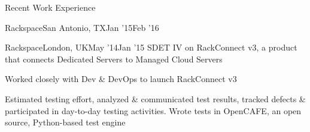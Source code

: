 \documentclass{resume} %
\begin{document}
\begin{rSection}{Recent Work Experience}
\begin{rSubsection}{Rackspace}{San Antonio, TX}{Jan '15}{Feb '16}
\end{rSubsection}


\begin{rSubsection}{Rackspace}{London, UK}{May '14}{Jan '15}
{SDET IV on RackConnect v3, a product that connects Dedicated Servers to Managed Cloud Servers}

\item Worked closely with Dev \& DevOps to launch RackConnect v3
\item Estimated testing effort, analyzed \& communicated test results, tracked defects \& participated in day-to-day testing activities. Wrote tests in OpenCAFE, an open source, Python-based test engine
\end{rSubsection}
\end{rSection}

\end{document}
